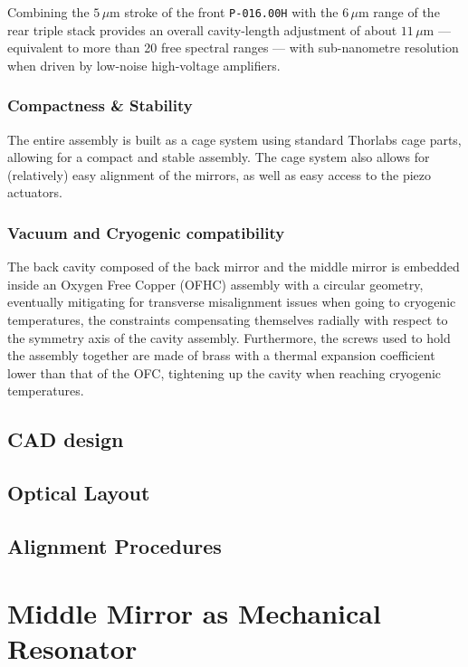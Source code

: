 Combining the $5\,\mu\text{m}$ stroke of the front \texttt{P-016.00H} with the $6\,\mu\text{m}$ range of the rear triple stack provides an overall cavity-length adjustment of about $11\,\mu\text{m}$ — equivalent to more than 20 free spectral ranges — with sub-nanometre resolution when driven by low-noise high-voltage amplifiers.


\subsubsection{Compactness \& Stability}
The entire assembly is built as a cage system using standard Thorlabs cage parts, allowing for a compact and stable assembly\cite{Thorlabs_cage}. The cage system also allows for (relatively) easy alignment of the mirrors, as well as easy access to the piezo actuators.

\subsubsection{Vacuum and Cryogenic compatibility}
The back cavity composed of the back mirror and the middle mirror is embedded inside an Oxygen Free Copper (OFHC) assembly with a circular geometry, eventually mitigating for transverse misalignment issues when going to cryogenic temperatures, the constraints compensating themselves radially with respect to the symmetry axis of the cavity assembly\cite{OFHC_review}. Furthermore, the screws used to hold the assembly together are made of brass with a thermal expansion coefficient lower than that of the OFC, tightening up the cavity when reaching cryogenic temperatures.





\subsection{CAD design}

\subsection{Optical Layout}
\subsection{Alignment Procedures}
\section{Middle Mirror as Mechanical Resonator}
